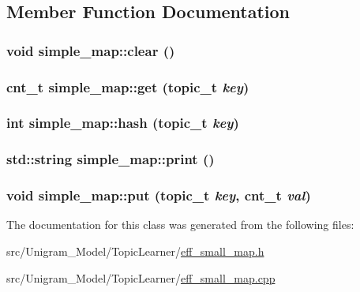 \subsection{Member Function Documentation}
\hypertarget{classsimple__map_ab4821c5c690ae253c92f91cdc1e80e68}{
\subsubsection[{clear}]{\setlength{\rightskip}{0pt plus 5cm}void simple\_\-map::clear ()}}
\label{classsimple__map_ab4821c5c690ae253c92f91cdc1e80e68}
\hypertarget{classsimple__map_a8b5d1ee44355470620c0812695eaf904}{
\subsubsection[{get}]{\setlength{\rightskip}{0pt plus 5cm}cnt\_\-t simple\_\-map::get (topic\_\-t {\em key})}}
\label{classsimple__map_a8b5d1ee44355470620c0812695eaf904}
\hypertarget{classsimple__map_a5949e03ae87e5bd7413f2ce8b54b67a1}{
\subsubsection[{hash}]{\setlength{\rightskip}{0pt plus 5cm}int simple\_\-map::hash (topic\_\-t {\em key})}}
\label{classsimple__map_a5949e03ae87e5bd7413f2ce8b54b67a1}
\hypertarget{classsimple__map_a1da12607eef1b029cef35ad01afeb149}{
\subsubsection[{print}]{\setlength{\rightskip}{0pt plus 5cm}std::string simple\_\-map::print ()}}
\label{classsimple__map_a1da12607eef1b029cef35ad01afeb149}
\hypertarget{classsimple__map_a2a6492f6894ec804a21dc3c6f16faa86}{
\subsubsection[{put}]{\setlength{\rightskip}{0pt plus 5cm}void simple\_\-map::put (topic\_\-t {\em key}, \/  cnt\_\-t {\em val})}}
\label{classsimple__map_a2a6492f6894ec804a21dc3c6f16faa86}


The documentation for this class was generated from the following files:\begin{DoxyCompactItemize}
\item 
src/Unigram\_\-Model/TopicLearner/\hyperlink{eff__small__map_8h}{eff\_\-small\_\-map.h}\item 
src/Unigram\_\-Model/TopicLearner/\hyperlink{eff__small__map_8cpp}{eff\_\-small\_\-map.cpp}\end{DoxyCompactItemize}
